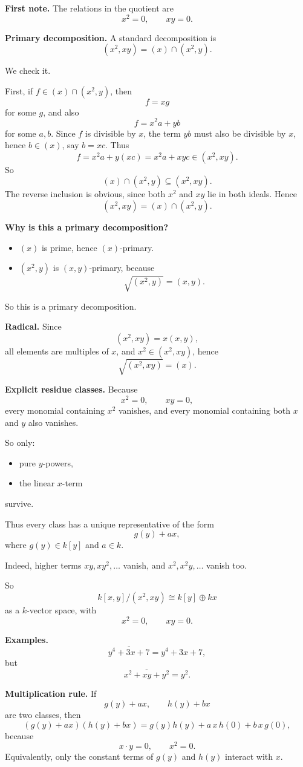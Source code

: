 \documentclass[12pt,a4paper]{article}
\theoremstyle{notespace}
\begin{document}
\textbf{First note.}
The relations in the quotient are
\[
x^2=0,\qquad xy=0.
\]

\textbf{Primary decomposition.}
A standard decomposition is
\[
(x^2,xy)=(x)\cap(x^2,y).
\]

We check it.

First, if \(f\in (x)\cap(x^2,y)\), then
\[
f=xg
\]
for some \(g\), and also
\[
f=x^2a+yb
\]
for some \(a,b\).
Since \(f\) is divisible by \(x\), the term \(yb\) must also be divisible by \(x\), hence \(b\in (x)\), say \(b=xc\).
Thus
\[
f=x^2a+y(xc)=x^2a+xyc\in (x^2,xy).
\]
So
\[
(x)\cap(x^2,y)\subseteq (x^2,xy).
\]
The reverse inclusion is obvious, since both \(x^2\) and \(xy\) lie in both ideals.
Hence
\[
(x^2,xy)=(x)\cap(x^2,y).
\]

\textbf{Why is this a primary decomposition?}
\begin{itemize}
	\item \((x)\) is prime, hence \((x)\)-primary.
	\item \((x^2,y)\) is \((x,y)\)-primary, because
	\[
	\sqrt{(x^2,y)}=(x,y).
	\]
\end{itemize}

So this is a primary decomposition.

\textbf{Radical.}
Since
\[
(x^2,xy)=x(x,y),
\]
all elements are multiples of \(x\), and \(x^2\in (x^2,xy)\), hence
\[
\sqrt{(x^2,xy)}=(x).
\]

\textbf{Explicit residue classes.}
Because
\[
x^2=0,\qquad xy=0,
\]
every monomial containing \(x^2\) vanishes, and every monomial containing both \(x\) and \(y\) also vanishes.

So only:
\begin{itemize}
	\item pure \(y\)-powers,
	\item the linear \(x\)-term
\end{itemize}
survive.

Thus every class has a unique representative of the form
\[
g(y)+ax,
\]
where \(g(y)\in k[y]\) and \(a\in k\).

Indeed, higher terms \(xy,xy^2,\dots\) vanish, and \(x^2,x^2y,\dots\) vanish too.

So
\[
k[x,y]/(x^2,xy)\cong k[y]\oplus kx
\]
as a \(k\)-vector space, with
\[
x^2=0,\qquad xy=0.
\]

\textbf{Examples.}
\[
\overline{y^4+3x+7}=y^4+3x+7,
\]
but
\[
\overline{x^2+xy+y^2}=y^2.
\]

\textbf{Multiplication rule.}
If
\[
g(y)+ax,\qquad h(y)+bx
\]
are two classes, then
\[
(g(y)+ax)(h(y)+bx)=g(y)h(y)+a\,x\,h(0)+b\,x\,g(0),
\]
because
\[
x\cdot y=0,\qquad x^2=0.
\]
Equivalently, only the constant terms of \(g(y)\) and \(h(y)\) interact with \(x\).
\end{document}
